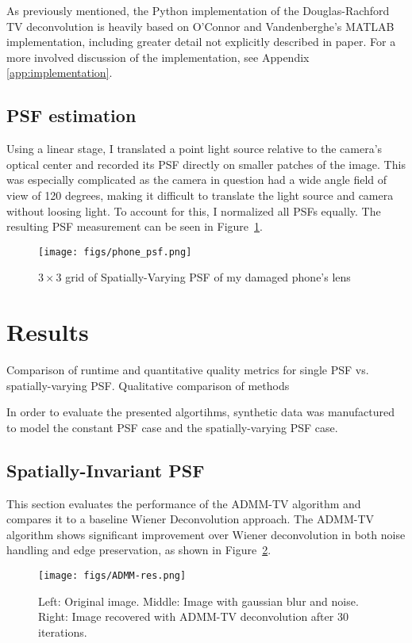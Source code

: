 \documentclass[sigconf]{acmart}
\begin{document}
As previously mentioned, the Python implementation of the Douglas-Rachford TV deconvolution is heavily based on O'Connor and Vandenberghe's MATLAB implementation, including greater detail not explicitly described in paper. For a more involved discussion of the implementation, see Appendix \ref{app:implementation}.
\subsection{PSF estimation}
Using a linear stage, I translated a point light source relative to the camera's optical center and recorded its PSF directly on smaller patches of the image. This was especially complicated as the camera in question had a wide angle field of view of 120 degrees, making it difficult to translate the light source and camera without loosing light. To account for this, I normalized all PSFs equally. The resulting PSF measurement can be seen in Figure~\ref{fig:phone-psf}.
\begin{figure}[h]
  \centering
  \texttt{[image: figs/phone\_psf.png]}
  \caption{$3\times 3$ grid of Spatially-Varying PSF of my damaged phone's lens}
  \label{fig:phone-psf}
\end{figure}

\section{Results}
Comparison of runtime and quantitative quality metrics for single PSF vs. spatially-varying PSF.
Qualitative comparison of methods

In order to evaluate the presented algortihms, synthetic data was manufactured to model the constant PSF case and the spatially-varying PSF case. 

\subsection{Spatially-Invariant PSF}
This section evaluates the performance of the ADMM-TV algorithm and compares it to a baseline Wiener Deconvolution approach. The ADMM-TV algorithm shows significant improvement over Wiener deconvolution in both noise handling and edge preservation, as shown in Figure~\ref{fig:admm-res}.

\begin{figure}[h]
  \centering
  \texttt{[image: figs/ADMM-res.png]}
  \caption{Left: Original image. Middle: Image with gaussian blur and noise. Right: Image recovered with ADMM-TV deconvolution after 30 iterations.}
  \label{fig:admm-res}
\end{figure}
\end{document}
